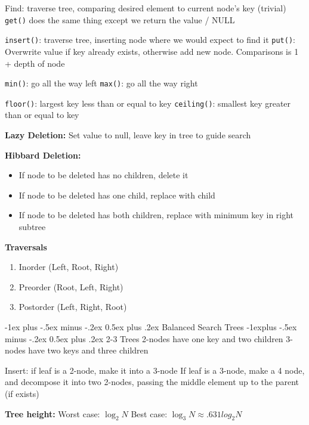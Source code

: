 \documentclass[letterpaper, 8pt]{extarticle}
\makeatletter
\renewcommand{\section}{\@startsection{section}{1}{0mm}%
                                {-1ex plus -.5ex minus -.2ex}%
                                {0.5ex plus .2ex}%
                                {\normalfont\normalsize\bfseries}}
\renewcommand{\subsection}{\@startsection{subsection}{2}{0mm}%
                                {-1explus -.5ex minus -.2ex}%
                                {0.5ex plus .2ex}%
                                {\normalfont\small\bfseries}}
\makeatother
\begin{document}
\begin{multicols*}{5}
  Find: traverse tree, comparing desired element to current node's key (trivial)
  \verb|get()| does the same thing except we return the value / NULL

  \verb|insert()|: traverse tree, inserting node where we would expect to find it
  \verb|put()|: Overwrite value if key already exists, otherwise add new node. Comparisons is 1 + depth of node

  \verb|min()|: go all the way left
  \verb|max()|: go all the way right

  \verb|floor()|: largest key less than or equal to key
  \verb|ceiling()|: smallest key greater than or equal to key

  \textbf{Lazy Deletion:} Set value to null, leave key in tree to guide search

  \textbf{Hibbard Deletion:}
  \begin{itemize}
    \item If node to be deleted has no children, delete it
    \item If node to be deleted has one child, replace with child
    \item If node to be deleted has both children, replace with minimum key in right subtree
  \end{itemize}

  \textbf{Traversals}
  \begin{enumerate}
    \item Inorder (Left, Root, Right)
    \item Preorder (Root, Left, Right)
    \item Postorder (Left, Right, Root)
  \end{enumerate}


  \section{Balanced Search Trees}
  \subsection{2-3 Trees}
  2-nodes have one key and two children
  3-nodes have two keys and three children

  Insert: if leaf is a 2-node, make it into a 3-node
  If leaf is a 3-node, make a 4 node, and decompose it into two 2-nodes, passing the middle element up to the parent (if exists)

  \textbf{Tree height:}
  Worst case: $\log_2 N$
  Best case: $\log_3 N \approx .631 log_2 N$


\end{multicols*}
\end{document}
